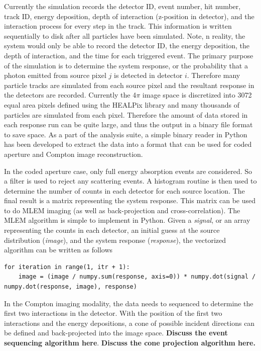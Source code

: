 \documentclass[10pt]{article}
\begin{document}
Currently the simulation records the detector ID, event number, hit number, track ID, energy deposition, depth of interaction (z-position in detector), and the interaction process for every step in the track. This information is written sequentially to disk after all particles have been simulated. Note, n reality, the system would only be able to record the detector ID, the energy deposition, the depth of interaction, and the time for each triggered event. The primary purpose of the simulation is to determine the system response, or the probability that a photon emitted from source pixel $j$ is detected in detector $i$. Therefore many particle tracks are simulated from each source pixel and the resultant response in the detectors are recorded. Currently the 4$\pi$ image space is discretized into 3072 equal area pixels defined using the HEALPix library \cite{Healpix2005} and many thousands of particles are simulated from each pixel. Therefore the amount of data stored in each response run can be quite large, and thus the output in a binary file format to save space. As a part of the analysis suite, a simple binary reader in Python has been developed to extract the data into a format that can be used for coded aperture and Compton image reconstruction.

In the coded aperture case, only full energy absorption events are considered. So a filter is used to reject any scattering events. A histogram routine is then used to determine the number of counts in each detector for each source location. The final result is a matrix representing the system response. This matrix can be used to do MLEM imaging (as well as back-projection and cross-correlation). The MLEM algorithm is simple to implement in Python. Given a \emph{signal}, or an array representing the counts in each detector, an initial guess at the source distribution (\emph{image}), and the system response (\emph{response}), the vectorized algorithm can be written as follows

\begin{lstlisting}
for iteration in range(1, itr + 1):
	image = (image / numpy.sum(response, axis=0)) * numpy.dot(signal / numpy.dot(response, image), response)
\end{lstlisting}

In the Compton imaging modality, the data needs to sequenced to determine the first two interactions in the detector. With the position of the first two interactions and the energy depositions, a cone of possible incident directions can be defined and back-projected into the image space. \textbf{Discuss the event sequencing algorithm here}. \textbf{Discuss the cone projection algorithm here.}
\end{document}

